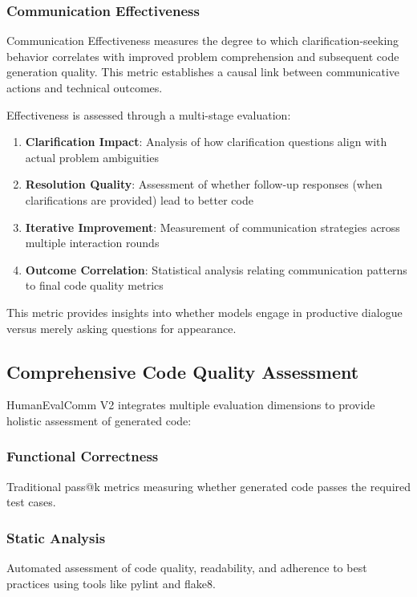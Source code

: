 \documentclass[conference]{IEEEtran}
\begin{document}
\subsubsection{Communication Effectiveness}

Communication Effectiveness measures the degree to which clarification-seeking behavior correlates with improved problem comprehension and subsequent code generation quality. This metric establishes a causal link between communicative actions and technical outcomes.

Effectiveness is assessed through a multi-stage evaluation:
\begin{enumerate}
    \item \textbf{Clarification Impact}: Analysis of how clarification questions align with actual problem ambiguities
    \item \textbf{Resolution Quality}: Assessment of whether follow-up responses (when clarifications are provided) lead to better code
    \item \textbf{Iterative Improvement}: Measurement of communication strategies across multiple interaction rounds
    \item \textbf{Outcome Correlation}: Statistical analysis relating communication patterns to final code quality metrics
\end{enumerate}

This metric provides insights into whether models engage in productive dialogue versus merely asking questions for appearance.

\subsection{Comprehensive Code Quality Assessment}

HumanEvalComm V2 integrates multiple evaluation dimensions to provide holistic assessment of generated code:

\subsubsection{Functional Correctness}

Traditional pass@k metrics measuring whether generated code passes the required test cases.

\subsubsection{Static Analysis}

Automated assessment of code quality, readability, and adherence to best practices using tools like pylint and flake8.
\end{document}
